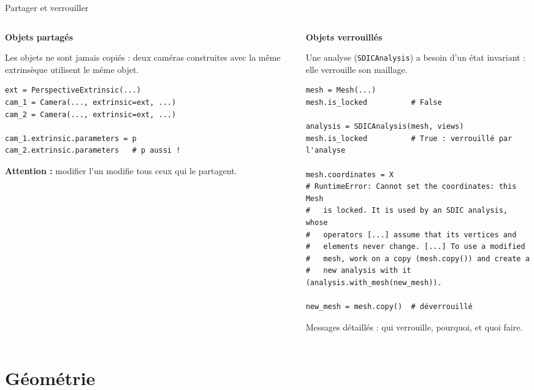 \documentclass[aspectratio=169,11pt]{beamer}
\newcommand{\cls}[1]{\textcolor{pyblue}{\texttt{#1}}}
\begin{document}
\begin{frame}[fragile]{Partager et verrouiller}
  \begin{columns}[T]
    \begin{column}{0.48\textwidth}
      \textbf{Objets \textcolor{pyred}{partagés}}

      \smallskip
      \scriptsize Les objets ne sont \alert{jamais copiés} : deux caméras construites avec
      la même extrinsèque utilisent \alert{le même objet}.
\begin{lstlisting}
ext = PerspectiveExtrinsic(...)
cam_1 = Camera(..., extrinsic=ext, ...)
cam_2 = Camera(..., extrinsic=ext, ...)
 
cam_1.extrinsic.parameters = p
cam_2.extrinsic.parameters   # p aussi !
\end{lstlisting}
      \textcolor{pyred}{\textbf{Attention :}} modifier l'un modifie \alert{tous} ceux qui
      le partagent.
    \end{column}
    \begin{column}{0.50\textwidth}
      \textbf{Objets \textcolor{pyred}{verrouillés}}

      \smallskip
      \scriptsize Une analyse (\cls{SDICAnalysis}) a besoin d'un état \alert{invariant} : elle verrouille
      son maillage.
\begin{lstlisting}[basicstyle=\ttfamily\tiny]
mesh = Mesh(...)
mesh.is_locked          # False
 
analysis = SDICAnalysis(mesh, views)
mesh.is_locked          # True : verrouillé par l'analyse
 
mesh.coordinates = X
# RuntimeError: Cannot set the coordinates: this Mesh
#   is locked. It is used by an SDIC analysis, whose
#   operators [...] assume that its vertices and
#   elements never change. [...] To use a modified
#   mesh, work on a copy (mesh.copy()) and create a
#   new analysis with it (analysis.with_mesh(new_mesh)).
 
new_mesh = mesh.copy()  # déverrouillé
\end{lstlisting}
      Messages \alert{détaillés} : qui verrouille, pourquoi, et quoi faire.
    \end{column}
  \end{columns}
\end{frame}
 
\section{Géométrie}
 
\end{document}
